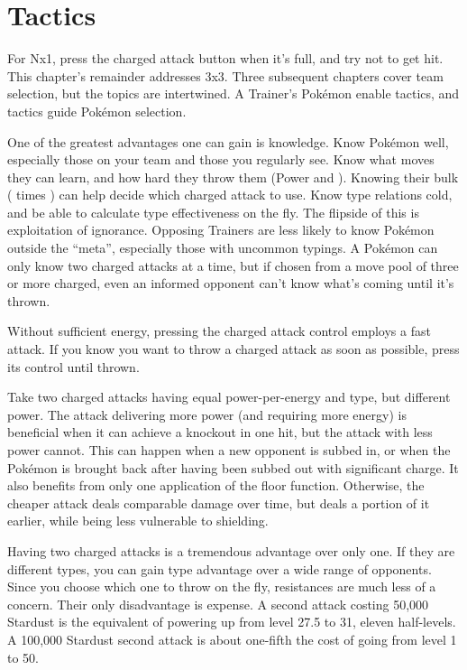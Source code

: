 \chapter{Tactics\label{chap:strategy}}
For Nx1, press the charged attack button when it's full, and try not to get hit.
This chapter's remainder addresses 3x3.
Three subsequent chapters cover team selection, but the topics are intertwined.
A Trainer's Pokémon enable tactics, and tactics guide Pokémon selection.

One of the greatest advantages one can gain is knowledge.
Know Pokémon well, especially those on your team and those you regularly see.
Know what moves they can learn, and how hard they throw them (Power and ).
Knowing their bulk ( times \MHP) can help decide which charged attack to use.
Know type relations cold, and be able to calculate type effectiveness on the fly.
The flipside of this is exploitation of ignorance.
Opposing Trainers are less likely to know Pokémon outside the ``meta'',
 especially those with uncommon typings.
A Pokémon can only know two charged attacks at a time, but if
 chosen from a move pool of three or more charged, even an informed opponent
 can't know what's coming until it's thrown.

\begin{tipbox}[title=A tip regarding battle UI]
Without sufficient energy, pressing the charged attack control employs a fast attack.
If you know you want to throw a charged attack as soon as possible, press its control until thrown.
\end{tipbox}

Take two charged attacks having equal power-per-energy and type, but different power.
The attack delivering more power (and requiring more energy) is beneficial
 when it can achieve a knockout in one hit, but the attack with less power cannot.
This can happen when a new opponent is subbed in, or when the Pokémon is brought back
 after having been subbed out with significant charge.
It also benefits from only one application of the floor function.
Otherwise, the cheaper attack deals comparable damage over time, but deals a portion
 of it earlier, while being less vulnerable to shielding.

Having two charged attacks is a tremendous advantage over only one.
If they are different types, you can gain type advantage over a wide range of opponents.
Since you choose which one to throw on the fly, resistances are much less of a concern.
Their only disadvantage is expense.
A second attack costing 50,000 Stardust is the equivalent of powering up from level 27.5 to 31,
 eleven half-levels.
A 100,000 Stardust second attack is about one-fifth the cost of going from level 1 to 50.

